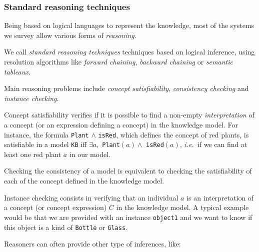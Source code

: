 \documentclass[a4paper, twocolumn]{article}
\newcommand{\ie}{{\textit{i.e.\ }}}
\newcommand{\concept}[1]{{\footnotesize \texttt{#1}}}
\begin{document}
\subsubsection{Standard reasoning techniques}

Being based on logical languages to represent the knowledge, most of the
systems we survey allow various forms of \emph{reasoning}.

We call \emph{standard reasoning techniques} techniques based on logical
inference, using resolution algorithms like \emph{forward chaining},
\emph{backward chaining} or \emph{semantic tableaux}.

Main reasoning problems include \emph{concept satisfiability},
\emph{consistency checking} and \emph{instance checking}.

Concept satisfiability verifies if it is possible to find a non-empty
\emph{interpretation} of a concept (or an expression defining a concept) in the
knowledge model. For instance, the formula \concept{Plant} $\land$
\concept{isRed}, which defines the concept of red plants, is satisfiable in a
model \concept{KB} iff $\exists a, $ \concept{Plant}$(a) \land$
\concept{isRed}$(a)$, \ie if we can find at least one red plant $a$ in our
model.

Checking the consistency of a model is equivalent to checking the
satisfiability of each of the concept defined in the knowledge model.

Instance checking consists in verifying that an individual $a$ is an
interpretation of a concept (or concept expression) $C$ in the knowledge model.
A typical example would be that we are provided with an instance
\concept{object1} and we want to know if this object is a kind of
\concept{Bottle} or \concept{Glass}.

Reasoners can often provide other type of inferences, like:
\end{document}
